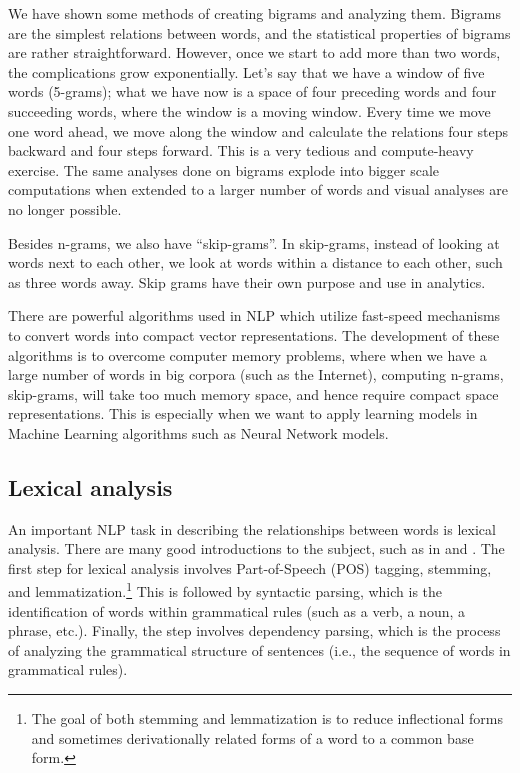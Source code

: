 \documentclass[
]{article}
\begin{document}
We have shown some methods of creating bigrams and analyzing them. Bigrams are the simplest relations between words, and the statistical properties of bigrams are rather straightforward. However, once we start to add more than two words, the complications grow exponentially. Let's say that we have a window of five words (5-grams); what we have now is a space of four preceding words and four succeeding words, where the window is a moving window. Every time we move one word ahead, we move along the window and calculate the relations four steps backward and four steps forward. This is a very tedious and compute-heavy exercise. The same analyses done on bigrams explode into bigger scale computations when extended to a larger number of words and visual analyses are no longer possible.

Besides n-grams, we also have ``skip-grams''. In skip-grams, instead of looking at words next to each other, we look at words within a distance to each other, such as three words away. Skip grams have their own purpose and use in analytics.

There are powerful algorithms used in NLP which utilize fast-speed mechanisms to convert words into compact vector representations. The development of these algorithms is to overcome computer memory problems, where when we have a large number of words in big corpora (such as the Internet), computing n-grams, skip-grams, will take too much memory space, and hence require compact space representations. This is especially when we want to apply learning models in Machine Learning algorithms such as Neural Network models.

\hypertarget{lexical-analysis}{%
\subsection{Lexical analysis}\label{lexical-analysis}}

An important NLP task in describing the relationships between words is lexical analysis. There are many good introductions to the subject, such as in \citet{manning1999} and \citet{manning2009}. The first step for lexical analysis involves Part-of-Speech (POS) tagging, stemming, and lemmatization.\footnote{The goal of both stemming and lemmatization is to reduce inflectional forms and sometimes derivationally related forms of a word to a common base form.} This is followed by syntactic parsing, which is the identification of words within grammatical rules (such as a verb, a noun, a phrase, etc.). Finally, the step involves dependency parsing, which is the process of analyzing the grammatical structure of sentences (i.e., the sequence of words in grammatical rules).
\end{document}
